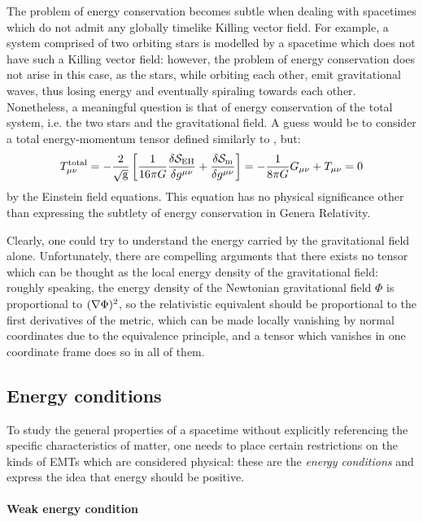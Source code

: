 The problem of energy conservation becomes subtle when dealing with spacetimes which do not admit any globally timelike Killing vector field.
For example, a system comprised of two orbiting stars is modelled by a spacetime which does not have such a Killing vector field: however, the problem of energy conservation does not arise in this case, as the stars, while orbiting each other, emit gravitational waves, thus losing energy and eventually spiraling towards each other. Nonetheless, a meaningful question is that of energy conservation of the total system, i.e. the two stars and the gravitational field. A guess would be to consider a total energy-momentum tensor defined similarly to , but:
\begin{equation*}
  T^{\text{total}}_{\mu \nu} = - \frac{2}{\sqrt{\mathrm{g}}} \left[ \frac{1}{16\pi G} \frac{\delta \mathcal{S}_{\text{EH}}}{\delta g^{\mu \nu}} + \frac{\delta \mathcal{S}_\text{m}}{\delta g^{\mu \nu}} \right] = - \frac{1}{8\pi G} G_{\mu \nu} + T_{\mu \nu} = 0
\end{equation*}
by the Einstein field equations. This equation has no physical significance other than expressing the subtlety of energy conservation in Genera Relativity.

Clearly, one could try to understand the energy carried by the gravitational field alone. Unfortunately, there are compelling arguments that there exists no tensor which can be thought as the local energy density of the gravitational field: roughly speaking, the energy density of the Newtonian gravitational field $ \Phi $ is proportional to $ (\nabla \Phi)^2 $, so the relativistic equivalent should be proportional to the first derivatives of the metric, which can be made locally vanishing by normal coordinates due to the equivalence principle, and a tensor which vanishes in one coordinate frame does so in all of them.

\subsection{Energy conditions}
\label{ssec:energy-conditions}

To study the general properties of a spacetime without explicitly referencing the specific characteristics of matter, one needs to place certain restrictions on the kinds of EMTs which are considered physical: these are the \textit{energy conditions} and express the idea that energy should be positive.

\paragraph{Weak energy condition}


